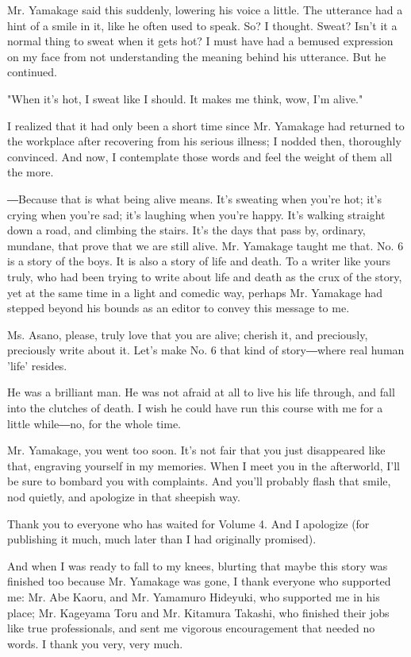 Mr. Yamakage said this suddenly, lowering his voice a little. The
utterance had a hint of a smile in it, like he often used to speak. So?
I thought. Sweat? Isn't it a normal thing to sweat when it gets hot? I
must have had a bemused expression on my face from not understanding the
meaning behind his utterance. But he continued.

"When it's hot, I sweat like I should. It makes me think, wow, I'm
alive."

I realized that it had only been a short time since Mr. Yamakage had
returned to the workplace after recovering from his serious illness; I
nodded then, thoroughly convinced. And now, I contemplate those words
and feel the weight of them all the more.

―Because that is what being alive means. It's sweating when you're hot;
it's crying when you're sad; it's laughing when you're happy. It's
walking straight down a road, and climbing the stairs. It's the days
that pass by, ordinary, mundane, that prove that we are still alive. Mr.
Yamakage taught me that. No. 6 is a story of the boys. It is also a
story of life and death. To a writer like yours truly, who had been
trying to write about life and death as the crux of the story, yet at
the same time in a light and comedic way, perhaps Mr. Yamakage had
stepped beyond his bounds as an editor to convey this message to me.

Ms. Asano, please, truly love that you are alive; cherish it, and
preciously, preciously write about it. Let's make No. 6 that kind of
story―where real human 'life' resides.

He was a brilliant man. He was not afraid at all to live his life
through, and fall into the clutches of death. I wish he could have run
this course with me for a little while―no, for the whole time.

Mr. Yamakage, you went too soon. It's not fair that you just disappeared
like that, engraving yourself in my memories. When I meet you in the
afterworld, I'll be sure to bombard you with complaints. And you'll
probably flash that smile, nod quietly, and apologize in that sheepish
way.

Thank you to everyone who has waited for Volume 4. And I apologize (for
publishing it much, much later than I had originally promised).

And when I was ready to fall to my knees, blurting that maybe this story
was finished too because Mr. Yamakage was gone, I thank everyone who
supported me: Mr. Abe Kaoru, and Mr. Yamamuro Hideyuki, who supported me
in his place; Mr. Kageyama Toru and Mr. Kitamura Takashi, who finished
their jobs like true professionals, and sent me vigorous encouragement
that needed no words. I thank you very, very much.

